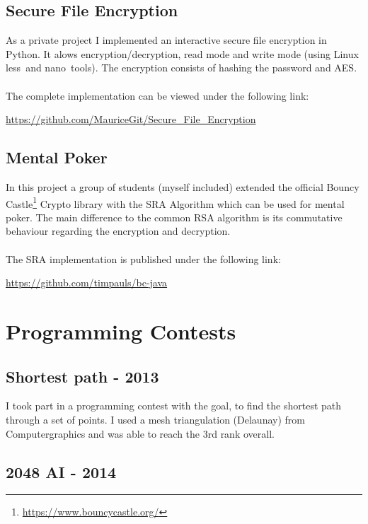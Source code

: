 \documentclass[a4paper, 12pt]{article}
\begin{document}
\subsection{Secure File Encryption}

As a private project I implemented an interactive secure file encryption in Python. It alows encryption/decryption, read mode and write mode (using Linux \glq less\grq\  and \glq nano\grq\ tools). The encryption consists of hashing the password and AES.
\\
\\
The complete implementation can be viewed under the following link:

\begin{center}
	\url{https://github.com/MauriceGit/Secure_File_Encryption}
\end{center}


\subsection{Mental Poker}

In this project a group of students (myself included) extended the official Bouncy Castle\footnote{\url{https://www.bouncycastle.org/}} Crypto library with the SRA Algorithm which can be used
for mental poker. The main difference to the common RSA algorithm is its commutative behaviour regarding 
the encryption and decryption.
\\
\\
The SRA implementation is published under the following link:

\begin{center}
	\url{https://github.com/timpauls/bc-java}
\end{center}

\newpage

\section{Programming Contests}

\subsection{Shortest path - 2013}

I took part in a programming contest with the goal, to find the shortest path through a set of points.
I used a mesh triangulation (Delaunay) from Computergraphics and was able to reach the 3rd rank
overall.

\subsection{2048 AI - 2014}
\end{document}
